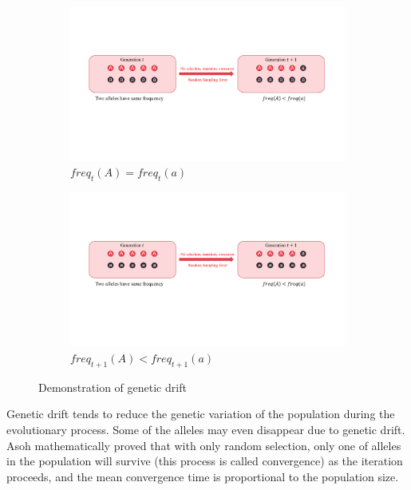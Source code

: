 \documentclass[conference]{IEEEtran}
\begin{document}
\begin{figure}[htbp]
	\centering
	\begin{subfigure}[b]{.24\textwidth}
		\includegraphics[width=\linewidth]{Section2/Generation_t}
		\caption{$freq_t(A) = freq_t(a)$}
	\end{subfigure}
	\begin{subfigure}[b]{.24\textwidth}
		\includegraphics[width=\linewidth]{Section2/Generation_t1}
		\caption{$freq_{t+1}(A) < freq_{t+1}(a)$}
	\end{subfigure}
	\caption{Demonstration of genetic drift}
	\label{fig:Genetic drift demo}
\end{figure}

Genetic drift tends to reduce the genetic variation of the population during the evolutionary process. Some of the alleles may even disappear due to genetic drift. Asoh\cite{Asoh} mathematically proved that with only random selection, only one of alleles in the population will survive (this process is called convergence) as the iteration proceeds, and the mean convergence time is proportional to the population size. 
\end{document}
